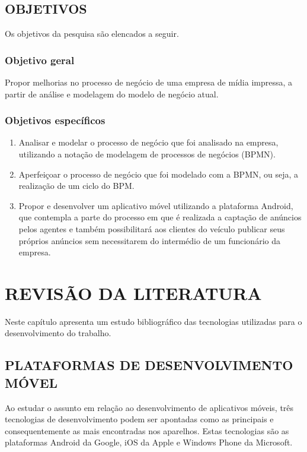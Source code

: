 \documentclass[
	12pt,				%
	openright,			%
	oneside,			%
	a4paper,			%
	chapter=TITLE,		%
	section=TITLE,		%
	english,			%
	french,				%
	spanish,			%
	brazil				%
	]{abntex2}
\begin{document}
\section{OBJETIVOS}

Os objetivos da pesquisa são elencados a seguir.

\subsection{Objetivo geral}

Propor melhorias no processo de negócio de uma empresa de mídia impressa, a partir de análise e modelagem do modelo de negócio atual.

\subsection{Objetivos específicos}

\begin{enumerate}[label=\itshape\alph*\upshape)]
	\item Analisar e modelar o processo de negócio que foi analisado na empresa, utilizando a notação de modelagem de processos de negócios (BPMN).
	\item	Aperfeiçoar o processo de negócio que foi modelado com a BPMN, ou seja, a realização de um ciclo do BPM.
	\item	Propor e desenvolver um aplicativo móvel utilizando a plataforma Android, que contempla a parte do processo em que é realizada a captação de anúncios pelos agentes e também possibilitará aos clientes do veículo publicar seus próprios anúncios sem necessitarem do intermédio de um funcionário da empresa. 
	
\end{enumerate}

\chapter{REVISÃO DA LITERATURA}\label{cap-revisao}
Neste capítulo apresenta um estudo bibliográfico das tecnologias utilizadas para o desenvolvimento do trabalho.

\section{PLATAFORMAS DE DESENVOLVIMENTO MÓVEL}
Ao estudar o assunto em relação ao desenvolvimento de aplicativos móveis, três tecnologias de desenvolvimento podem ser apontadas como as principais e consequentemente as mais encontradas nos aparelhos. Estas tecnologias são as plataformas Android da Google, iOS da Apple e Windows Phone da Microsoft.
\end{document}
